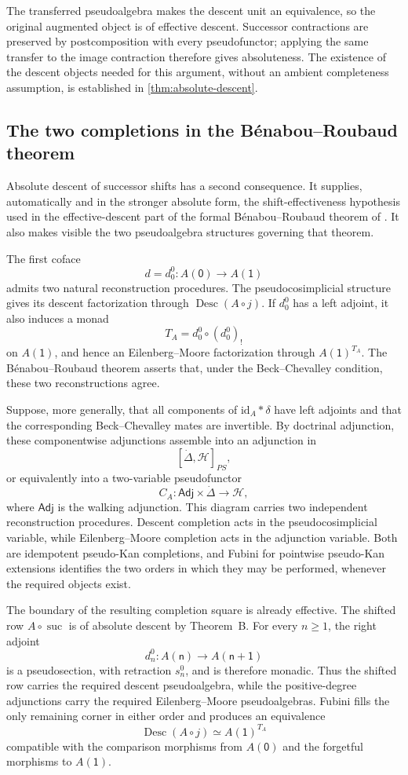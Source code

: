 \documentclass[11pt,a4paper]{article}
\numberwithin{equation}{section}
\theoremstyle{definition}
\theoremstyle{remark}
\newcommand{\id}{\mathrm{id}}
\newcommand{\Hcat}{\mathcal H}
\newcommand{\Desc}{\operatorname{Desc}}
\newcommand{\suc}{\operatorname{suc}}
\newcommand{\Adj}{\mathsf{Adj}}
\begin{document}
The transferred pseudoalgebra makes the descent unit an equivalence,
so the original augmented object is of effective descent. Successor
contractions are preserved by postcomposition with every
pseudofunctor; applying the same transfer to the image contraction
therefore gives absoluteness. The existence of the descent objects
needed for this argument, without an ambient completeness
assumption, is established in \cref{thm:absolute-descent}.

\subsection*{The two completions in the B\'enabou--Roubaud theorem}

Absolute descent of successor shifts has a second consequence. It
supplies, automatically and in the stronger absolute form, the
shift-effectiveness hypothesis used in the effective-descent part of
the formal B\'enabou--Roubaud theorem of
\cite[Theorem~8.5]{Nunes2018}. It also makes visible the two
pseudoalgebra structures governing that theorem.

The first coface
\[
d  = d_0^0\colon A(\mathsf 0)\longrightarrow A(\mathsf 1)
\]
admits two natural reconstruction procedures. The
pseudocosimplicial structure gives its descent factorization through
\(\Desc(A\circ j)\). If \(d_0^0\) has a left adjoint, it also induces a monad
\[
T_A=d_0^0\circ(d_0^0)_!
\]
on \(A(\mathsf 1)\), and hence an Eilenberg--Moore factorization through
\(A(\mathsf 1)^{T_A}\). The B\'enabou--Roubaud theorem asserts that, under the
Beck--Chevalley condition, these two reconstructions agree.

Suppose, more generally, that all components of \(\id_A\ast\delta\) have
left adjoints and that the corresponding Beck--Chevalley mates
are invertible. By doctrinal adjunction, these componentwise
adjunctions assemble into an adjunction in
\[
[\dot\Delta,\Hcat]_{PS},
\]
or equivalently into a two-variable pseudofunctor
\[
C_A\colon\Adj\times\dot\Delta\longrightarrow\Hcat,
\]
where \(\Adj\) is the walking adjunction. This diagram carries two
independent reconstruction procedures. Descent completion acts in the
pseudocosimplicial variable, while Eilenberg--Moore completion acts in
the adjunction variable. Both are idempotent pseudo-Kan completions,
and Fubini for pointwise pseudo-Kan extensions identifies the two
orders in which they may be performed, whenever the required objects
exist.

The boundary of the resulting completion square is already effective.
The shifted row \(A\circ\suc\) is of absolute descent by Theorem~B.
For every \(n\geq1\), the right adjoint
\[
d_n^0\colon A(\mathsf n)\longrightarrow A(\mathsf{n+1})
\]
is a pseudosection, with retraction \(s_n^0\), and is therefore
monadic. Thus the shifted row carries the required descent
pseudoalgebra, while the positive-degree adjunctions carry the required
Eilenberg--Moore pseudoalgebras. Fubini fills the only remaining corner
in either order and produces an equivalence
\[
\Desc(A\circ j)\simeq A(\mathsf 1)^{T_A}
\]
compatible with the comparison morphisms from \(A(\mathsf 0)\) and the
forgetful morphisms to \(A(\mathsf 1)\).
\end{document}
